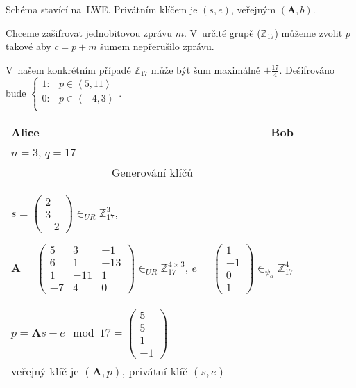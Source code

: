 Schéma stavící na~LWE.
Privátním klíčem je $(s, e)$, veřejným $(\textbf{A}, b)$.

Chceme zašifrovat jednobitovou zprávu $m$.
V~určité grupě ($\mathbb{Z}_{17}$) můžeme zvolit $p$ takové aby $c = p+m$ šumem nepřerušilo zprávu.

V~našem konkrétním případě $\mathbb{Z}_{17}$ může být šum maximálně $\pm \frac{17}{4}$.
Dešifrováno bude $\begin{cases}
1: & p \in \left<5, 11\right> \\
0: & p \in \left<-4, 3\right> \\
\end{cases}$.

\begin{table}[ht]
    \centering
    \begin{tabular}{lr}
    \textbf{Alice} & \textbf{Bob} \\
    $n = 3$, $q = 17$ \\

    \multicolumn{2}{c}{Generování klíčů} \\
    \multicolumn{2}{l}{
    $s = \left(\begin{matrix}
    2 \\ 3 \\ -2
    \end{matrix}\right) \in_{UR} \mathbb{Z}_{17}^3$,

    $\textbf{A} = \left(\begin{matrix}
    5 & 3 & -1 \\ 6 & 1 & -13 \\ 1 & -11 & 1 \\ -7 & 4 & 0
    \end{matrix}\right) \in_{UR} \mathbb{Z}_{17}^{4 \times 3}$,
    $e = \left(\begin{matrix}
    1 \\ -1 \\ 0 \\ 1
    \end{matrix}\right) \in_{\psi_\alpha} \mathbb{Z}_{17}^4$
    \hspace*{5em}
    } \\
    $p = \textbf{A}s + e \mod {17} = \left(\begin{matrix}
    5 \\ 5 \\ 1 \\ -1
    \end{matrix}\right)$ \\
    veřejný klíč je $(\textbf{A}, p)$, privátní klíč $(s, e)$ \\


\end{tabular}
\end{table}
